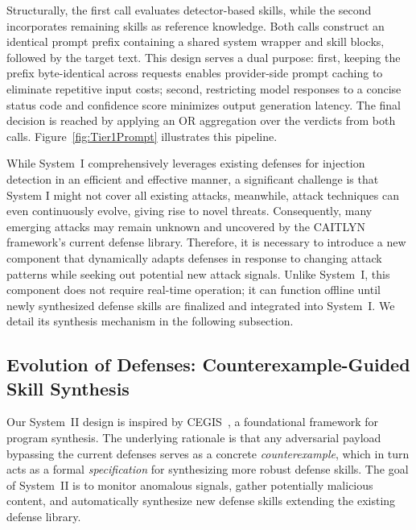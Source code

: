 Structurally, the first call evaluates detector-based skills, while
the second incorporates remaining skills as reference knowledge. Both
calls construct an identical prompt prefix containing a shared system
wrapper and skill blocks, followed by the target text. This design
serves a dual purpose: first, keeping the prefix byte-identical across
requests enables provider-side prompt caching to eliminate repetitive
input costs; second, restricting model responses to a concise status
code and confidence score minimizes output generation latency. The
final decision is reached by applying an OR aggregation over the
verdicts from both calls.
Figure~\ref{fig:Tier1Prompt} illustrates
this pipeline.


% 

While System~I comprehensively leverages existing defenses for
injection detection in an efficient and effective manner, a
significant challenge is that System I might not cover all existing
attacks, meanwhile, attack techniques can even continuously evolve,
giving rise to novel threats. Consequently, many emerging attacks may
remain unknown and uncovered by the CAITLYN framework's current
defense library.
Therefore, it is necessary to introduce a new component that
dynamically adapts defenses in response to changing attack patterns
while seeking out potential new attack signals. Unlike System~I, this
component does not require real-time operation; it can function
offline until newly synthesized defense skills are finalized and
integrated into System~I.
We detail its synthesis mechanism in the following subsection.

\subsection{Evolution of Defenses: Counterexample-Guided Skill Synthesis}
\label{sec:synthesis}

Our System~II design is inspired by
CEGIS~\cite{sketch2006,sygus2013,flashfill2011}, a foundational
framework for program synthesis. The underlying rationale is that any
adversarial payload bypassing the current defenses serves as a
concrete \emph{counterexample}, which in turn acts as a formal
\emph{specification} for synthesizing more robust defense skills.
The goal of System~II is to monitor anomalous signals, gather
potentially malicious content, and automatically synthesize new
defense skills extending the existing defense library.

